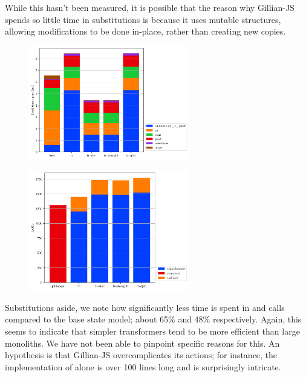 While this hasn't been measured, it is possible that the reason why Gillian-JS spends so little time in substitutions is because it uses mutable structures, allowing modifications to be done in-place, rather than creating new copies.

\begin{figure}
\centering
\begin{minipage}[t]{.45\textwidth}
	\centering
	\includegraphics[width=7cm]{figures/js/verif_time_spent_per_action.pdf}
	\label{fig:js-timespent-verif}
\end{minipage}\hfill%
\begin{minipage}[t]{.45\textwidth}
	\centering
	\includegraphics[width=7cm]{figures/js/locs.pdf}
	\label{fig:js-loc-count}
\end{minipage}%
\end{figure}

Substitutions aside, we note how significantly less time is spent in \execac{} and \consume{} calls compared to the base state model; about 65\% and 48\% respectively. Again, this seems to indicate that simpler transformers tend to be more efficient than large monoliths. We have not been able to pinpoint specific reasons for this. An hypothesis is that Gillian-JS overcomplicates its actions; for instance, the implementation of  alone is over 100 lines long and is surprisingly intricate.

